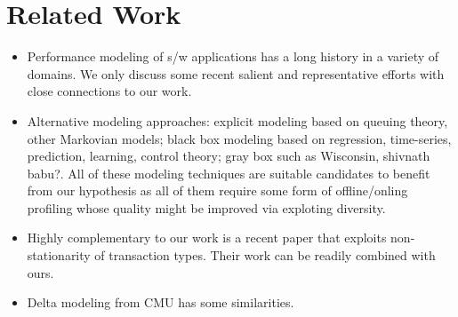 \section{Related Work}
\label{sec:related}
\vspace{10pt}

\begin{itemize}
\item Performance modeling of s/w applications has a long history in a variety of domains. We only discuss some recent salient and representative efforts with close connections to our work.
\item Alternative modeling approaches: explicit modeling based on queuing theory, other Markovian models; black box modeling based on regression, time-series, prediction, learning, control theory; gray box such as Wisconsin, shivnath babu?. All of these modeling techniques are suitable candidates to benefit from our hypothesis as all of them require some form of offline/onling profiling whose quality might be improved via exploting diversity. 
\item Highly complementary to our work is a recent paper that exploits non-stationarity of transaction types. Their work can be readily combined with ours. 
\item Delta modeling from CMU has some similarities. 
\end{itemize}
